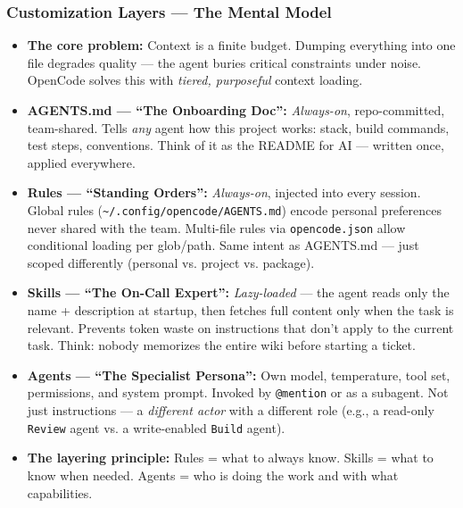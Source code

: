 \begin{frame}[fragile]\frametitle{Customization Layers — The Mental Model}
  \begin{itemize}
    \item \textbf{The core problem:} Context is a finite budget. Dumping everything into one file degrades quality — the agent buries critical constraints under noise. OpenCode solves this with \textit{tiered, purposeful} context loading.
    \item \textbf{AGENTS.md — ``The Onboarding Doc'':} \textit{Always-on}, repo-committed, team-shared. Tells \textit{any} agent how this project works: stack, build commands, test steps, conventions. Think of it as the README for AI — written once, applied everywhere.
    \item \textbf{Rules — ``Standing Orders'':} \textit{Always-on}, injected into every session. Global rules (\texttt{\textasciitilde/.config/opencode/AGENTS.md}) encode personal preferences never shared with the team. Multi-file rules via \texttt{opencode.json} allow conditional loading per glob/path. Same intent as AGENTS.md — just scoped differently (personal vs. project vs. package).
    \item \textbf{Skills — ``The On-Call Expert'':} \textit{Lazy-loaded} — the agent reads only the name + description at startup, then fetches full content only when the task is relevant. Prevents token waste on instructions that don't apply to the current task. Think: nobody memorizes the entire wiki before starting a ticket.
    \item \textbf{Agents — ``The Specialist Persona'':} Own model, temperature, tool set, permissions, and system prompt. Invoked by \texttt{@mention} or as a subagent. Not just instructions — a \textit{different actor} with a different role (e.g., a read-only \texttt{Review} agent vs. a write-enabled \texttt{Build} agent).
    \item \textbf{The layering principle:} Rules = what to always know. Skills = what to know when needed. Agents = who is doing the work and with what capabilities.
  \end{itemize}
\end{frame}


